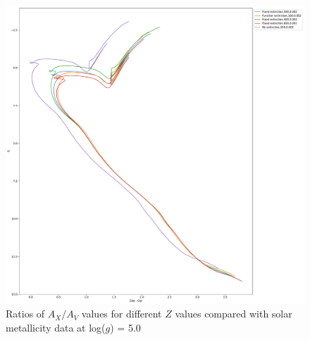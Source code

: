 \documentclass[12pt, a4paper]{report}
\begin{document}
\begin{figure}[h]
\begin{center}
\includegraphics[scale=0.3]{../basti_isochrones_10_13Gyr/Extinction_T5k_FeH0fix_func_G_GbpmGrp_500_400_600_Myr_FeH_0p002_ref_noext_Av_1p0.pdf}
\caption{Ratios of $A_{X}/A_{V}$ values for different $Z$ values compared with solar metallicity data at log($g$) = 5.0}
\label{gaia_isoc_T5k}
\end{center}
\end{figure}
\end{document}
